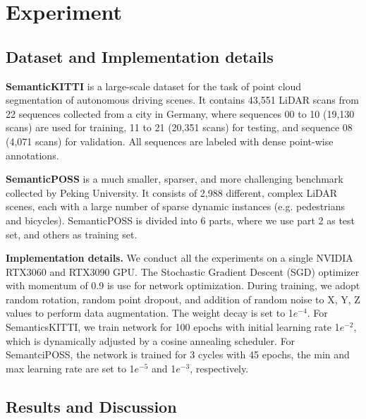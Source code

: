 \documentclass{article}
\begin{document}
\section{Experiment}

\subsection{Dataset and Implementation details}
\noindent\textbf{SemanticKITTI} is a large-scale dataset for the task of point cloud segmentation of autonomous driving scenes. It contains 43,551 LiDAR scans from 22 sequences collected from a city in Germany, where sequences 00 to 10 (19,130 scans) are used for training, 11 to 21 (20,351 scans) for testing, and sequence 08 (4,071 scans) for validation. All sequences are labeled with dense point-wise annotations.

\noindent\textbf{SemanticPOSS} is a much smaller, sparser, and more challenging benchmark collected by Peking University. It consists of 2,988 different, complex LiDAR scenes, each with a large number of sparse dynamic instances (e.g. pedestrians and bicycles). SemanticPOSS is divided into 6 parts, where we use part 2 as test set, and others as training set. 

\noindent\textbf{Implementation details.}  We conduct all the experiments on a single NVIDIA RTX3060 and RTX3090 GPU. The Stochastic Gradient Descent (SGD) optimizer with momentum of 0.9 is use for network optimization. During training, we adopt random rotation, random point dropout, and addition of random noise to X, Y, Z values to perform data augmentation. The weight decay is set to 1$e^{-4}$. For SemanticsKITTI, we train network for 100 epochs with initial learning rate 1$e^{-2}$, which is dynamically adjusted by a cosine annealing scheduler. For SemantciPOSS, the network is trained for 3 cycles with 45 epochs, the min and max learning rate are set to 1$e^{-5}$ and 1$e^{-3}$, respectively. 

\subsection{Results and Discussion}
\end{document}
